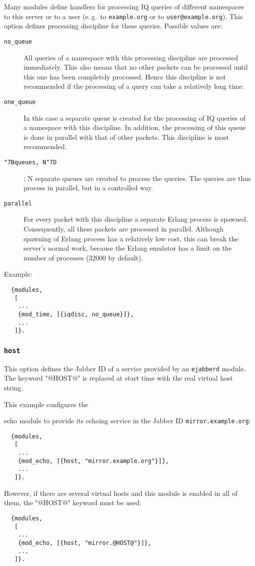 \documentclass[a4paper,10pt]{book}
\newcommand{\ind}[1]{\begin{latexonly}\index{#1}\end{latexonly}}
\newcommand{\bracehack}{\def\{{\char"7B}\def\}{\char"7D}}
\newcommand{\titem}[1]{\item[\bracehack\texttt{#1}]}
\newcommand{\jid}[1]{\texttt{#1}}
\newcommand{\option}[1]{\texttt{#1}}
\newcommand{\ejabberd}{\texttt{ejabberd}}
\newcommand{\module}[1]{\texttt{#1}}
\newcommand{\modecho}{\module{mod\_echo}}
\begin{document}
Many modules define handlers for processing IQ queries of different namespaces
to this server or to a user (e.\,g.\ to \jid{example.org} or to
\jid{user@example.org}). This option defines processing discipline for
these queries. Possible values are:
\begin{description}
\titem{no\_queue} All queries of a namespace with this processing discipline are
  processed immediately. This also means that no other packets can be processed
  until this one has been completely processed. Hence this discipline is not
  recommended if the processing of a query can take a relatively long time.
\titem{one\_queue} In this case a separate queue is created for the processing
  of IQ queries of a namespace with this discipline. In addition, the processing
  of this queue is done in parallel with that of other packets. This discipline
  is most recommended.
  \titem{\{queues, N\}}: N separate queues are created to process the
  queries. The queries are thus process in parallel, but in a
  controlled way.
\titem{parallel} For every packet with this discipline a separate Erlang process
  is spawned. Consequently, all these packets are processed in parallel.
  Although spawning of Erlang process has a relatively low cost, this can break
  the server's normal work, because the Erlang emulator has a limit on the
  number of processes (32000 by default).
\end{description}

Example:
\begin{verbatim}
  {modules,
   [
    ...
    {mod_time, [{iqdisc, no_queue}]},
    ...
   ]}.
\end{verbatim}

\subsubsection{\option{host}}
\label{modhostoption}
\ind{options!host}

This option defines the Jabber ID of a service provided by an \ejabberd{} module.
The keyword "@HOST@" is replaced at start time with the real virtual host string.

This example configures
the \ind{modules!\modecho{}}echo module to provide its echoing service 
in the Jabber ID \jid{mirror.example.org}:
    \begin{verbatim}
  {modules,
   [
    ...
    {mod_echo, [{host, "mirror.example.org"}]},
    ...
   ]}.
\end{verbatim}

However, if there are several virtual hosts and this module is enabled in all of them,
the "@HOST@" keyword must be used:
    \begin{verbatim}
  {modules,
   [
    ...
    {mod_echo, [{host, "mirror.@HOST@"}]},
    ...
   ]}.
\end{verbatim}
\end{document}
